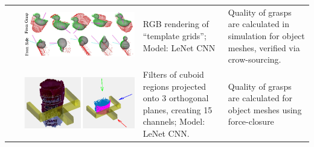 \documentclass[runningheads]{../llncs}
\begin{document}
\begin{table}[h!]
\begin{tabularx}{\linewidth}{L{0.05\linewidth}C{0.39\linewidth}L{0.28\linewidth}L{0.28\linewidth}}
        \cite{Kappler2015}  & \includegraphics[scale=0.16,valign=t]{kappler_et_al-2015-fig8-local_shape_diff_viewpoints}
            & RGB rendering of ``template grids''; \linebreak Model: LeNet CNN
            & Quality of grasps are \linebreak calculated in simulation \linebreak for object meshes,
            \linebreak verified via crow-sourcing. \\

        \cite{Gualtieri2016}& \includegraphics[scale=0.1,valign=t]{Gualtieri_et_al-2016-grasp_representation}
            & Filters of cuboid regions projected onto 3 orthogonal planes, creating 15 channels;
            \linebreak Model: LeNet CNN.
            & Quality of grasps are \linebreak calculated for object \linebreak meshes using force-closure \\


\end{tabularx}
\end{table}
\end{document}
